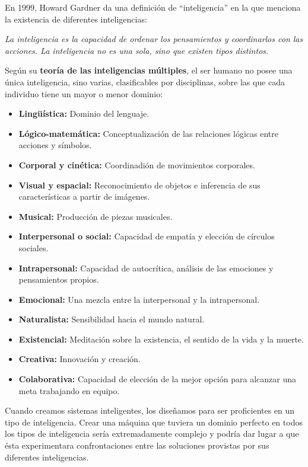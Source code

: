 En 1999, Howard Gardner da una definición de ``inteligencia'' en la que menciona la existencia de diferentes inteligencias:

\begin{displayquote}
\textit{La inteligencia es la capacidad de ordenar los pensamientos y coordinarlos con las acciones.
La inteligencia no es una sola, sino que existen tipos distintos.}
\end{displayquote}

Según su \textbf{teoría de las inteligencias múltiples}, el ser humano no posee una única inteligencia, sino varias, clasificables por disciplinas, sobre las que cada individuo tiene un mayor o menor dominio:

\begin{itemize}
	\item\textbf{Lingüística:} Dominio del lenguaje.
	\item\textbf{Lógico-matemática:} Conceptualización de las relaciones lógicas entre acciones y símbolos.
	\item\textbf{Corporal y cinética:} Coordinadión de movimientos corporales.
	\item\textbf{Visual y espacial:} Reconocimiento de objetos e inferencia de sus características a partir de imágenes.
	\item\textbf{Musical:} Producción de piezas musicales.
	\item\textbf{Interpersonal o social:} Capacidad de empatía y elección de círculos sociales.
	\item\textbf{Intrapersonal:} Capacidad de autocrítica, análisis de las emociones y pensamientos propios.
	\item\textbf{Emocional:} Una mezcla entre la interpersonal y la intrapersonal.
	\item\textbf{Naturalista:} Sensibilidad hacia el mundo natural.
	\item\textbf{Existencial:} Meditación sobre la existencia, el sentido de la vida y la muerte.
	\item\textbf{Creativa:} Innovación y creación.
	\item\textbf{Colaborativa:} Capacidad de elección de la mejor opción para alcanzar una meta trabajando en equipo.
\end{itemize}

Cuando creamos sistemas inteligentes, los diseñamos para ser proficientes en un tipo de inteligencia.
Crear una máquina que tuviera un dominio perfecto en todos los tipos de inteligencia sería extremadamente complejo y podría dar lugar a que ésta experimentara confrontaciones entre las soluciones provistas por sus diferentes inteligencias.

